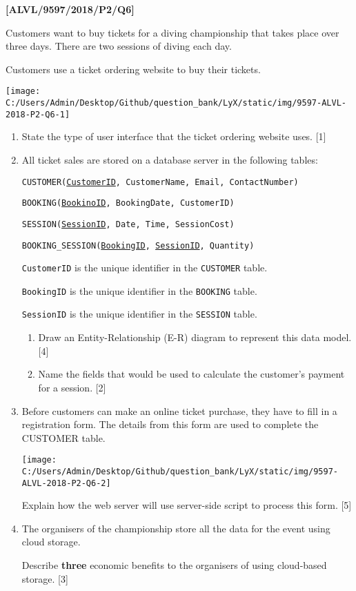 \item \textbf{{[}ALVL/9597/2018/P2/Q6{]} }

Customers want to buy tickets for a diving championship that takes
place over three days. There are two sessions of diving each day. 

Customers use a ticket ordering website to buy their tickets.
\begin{center}
\texttt{[image: C:/Users/Admin/Desktop/Github/question\_bank/LyX/static/img/9597-ALVL-2018-P2-Q6-1]}
\par\end{center}
\begin{enumerate}
\item State the type of user interface that the ticket ordering website
uses. \hfill{}{[}1{]}
\item All ticket sales are stored on a database server in the following
tables: 

\texttt{CUSTOMER(}\texttt{\uline{CustomerID}}\texttt{, CustomerName,
Email, ContactNumber) }

\texttt{BOOKING(}\texttt{\uline{BookinoID}}\texttt{, BookingDate,
CustomerID) }

\texttt{SESSION(}\texttt{\uline{SessionID}}\texttt{, Date, Time,
SessionCost) }

\texttt{BOOKING\_SESSION(}\texttt{\uline{BookingID}}\texttt{, }\texttt{\uline{SessionID}}\texttt{,
Quantity)} 

\texttt{CustomerID} is the unique identifier in the \texttt{CUSTOMER}
table. 

\texttt{BookingID} is the unique identifier in the \texttt{BOOKING}
table. 

\texttt{SessionID} is the unique identifier in the \texttt{SESSION}
table. 
\begin{enumerate}
\item Draw an Entity-Relationship (E-R) diagram to represent this data model.
\hfill{}{[}4{]}
\item Name the fields that would be used to calculate the customer\textquoteright s
payment for a session. \hfill{}{[}2{]}
\end{enumerate}
\item Before customers can make an online ticket purchase, they have to
fill in a registration form. The details from this form are used to
complete the CUSTOMER table. 
\begin{center}
\texttt{[image: C:/Users/Admin/Desktop/Github/question\_bank/LyX/static/img/9597-ALVL-2018-P2-Q6-2]}
\par\end{center}

Explain how the web server will use server-side script to process
this form. \hfill{} {[}5{]}
\item The organisers of the championship store all the data for the event
using cloud storage. 

Describe\textbf{ three} economic benefits to the organisers of using
cloud-based storage. \hfill{}{[}3{]}
\end{enumerate}